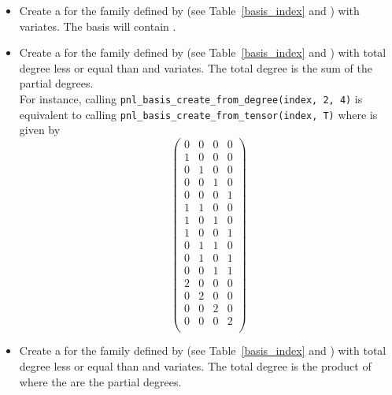 \begin{itemize}
  \item {}
    \sshortdescribe Create a \PnlBasis for the family
    defined by  (see Table~\ref{basis_index} and
    ) with 
    variates. The basis will contain .

  \item {}
    \sshortdescribe Create a \PnlBasis for the family
    defined by  (see Table~\ref{basis_index} and ) with total degree less
    or equal than  and  variates. The total degree is
    the sum of the partial degrees.\\
    For instance, calling \verb!pnl_basis_create_from_degree(index, 2, 4)! is
    equivalent to calling \verb!pnl_basis_create_from_tensor(index, T)! where
     is given by
    \[ \left(
      \begin{array}{cccc}
        0 & 0 & 0 & 0\\
        1 & 0 & 0 & 0\\
        0 & 1 & 0 & 0\\
        0 & 0 & 1 & 0\\
        0 & 0 & 0 & 1\\
        1 & 1 & 0 & 0\\
        1 & 0 & 1 & 0\\
        1 & 0 & 0 & 1\\
        0 & 1 & 1 & 0\\
        0 & 1 & 0 & 1\\
        0 & 0 & 1 & 1\\
        2 & 0 & 0 & 0\\
        0 & 2 & 0 & 0\\
        0 & 0 & 2 & 0\\
        0 & 0 & 0 & 2\\
      \end{array}
    \right) \]
  \item {}
    \sshortdescribe Create a \PnlBasis for the family
    defined by  (see Table~\ref{basis_index} and ) with total degree less
    or equal than  and  variates. The total degree is
    the product of  where the  are the partial degrees.


\end{itemize}
